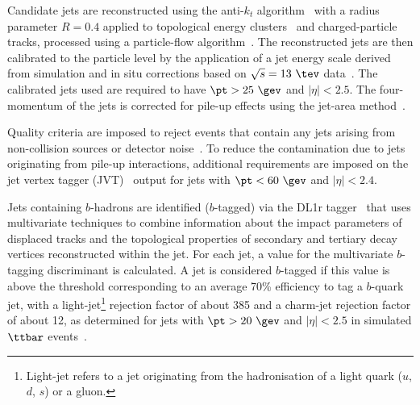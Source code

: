 \documentclass[PAPER, coverpage, atlasdraft=true, texlive=2016, UKenglish]{\ATLASLATEXPATH atlasdoc}
\begin{document}
Candidate jets are reconstructed using the anti-$k_t$ algorithm~\cite{Cacciari:2008gp,Cacciari:2005hq} with a
radius parameter $R=0.4$ applied to topological energy clusters~\cite{Aad:2016upy} and charged-particle tracks, processed using
a particle-flow algorithm~\cite{Aad:2017epj77}. %
The reconstructed jets are then calibrated to the particle level by the application of a jet energy scale 
derived from simulation and in situ corrections based on $\sqrt{s}=13~\tev$ data~\cite{Aaboud:2017jcu}. %
The calibrated jets used are required to have $\pt > 25~\gev$ and $|\eta| < 2.5$.
The four-momentum of the jets is corrected for pile-up effects using the jet-area method~\cite{Cacciari:2008gn}.

Quality criteria are imposed to reject events that contain any jets arising from non-collision sources
or detector noise~\cite{ATLAS-CONF-2015-029}.  To reduce the contamination due to jets originating from pile-up interactions,
additional requirements are imposed on the jet vertex tagger (JVT)~\cite{Aad:2015ina} output for jets with $\pt<60~\gev$ and $|\eta| < 2.4$.

Jets containing $b$-hadrons are identified ($b$-tagged) via the DL1r tagger~\cite{Aad:2019epj79,ATL-PHYS-PUB-2017-013} %
that uses multivariate techniques to combine information about the impact parameters of displaced tracks and the  topological properties 
of secondary and tertiary decay vertices reconstructed within the jet. For each jet, a value for the multivariate $b$-tagging discriminant is 
calculated. A jet is considered $b$-tagged if this value is above the threshold corresponding to
an average 70\% efficiency to tag a $b$-quark jet, with a light-jet\footnote{Light-jet refers to a jet originating from the hadronisation of a light quark ($u$, $d$, $s$) or a gluon.} rejection factor of about 385 and a charm-jet rejection factor of about 12, as determined for jets with
$\pt >20~\gev$ and $|\eta|<2.5$ in simulated $\ttbar$ events~\cite{Aad:2019epj79}.
\end{document}
